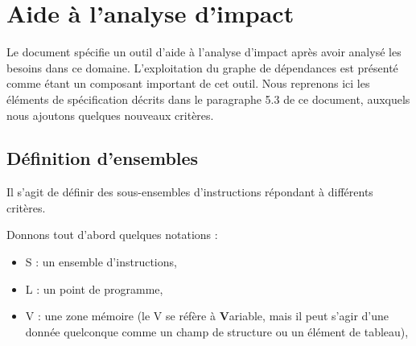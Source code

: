 \chapter{Aide à l'analyse d'impact}\label{sec-impact}

Le document \cite{baudinImpact} spécifie un outil d'aide à l'analyse d'impact
après avoir analysé les besoins dans ce domaine.
L'exploitation du graphe de dépendances est présenté comme étant 
un composant important de cet outil.
Nous reprenons ici les éléments de spécification 
décrits dans le paragraphe 5.3 de ce document,
auxquels nous ajoutons quelques nouveaux critères.\\


\section{Définition d'ensembles}\label{sec-ensembles}\label{sec-defR}

\newcommand{\remitem}[1]{\begin{itemize}\item #1 \end{itemize}}
\newcommand{\warnitem}[1]{\begin{itemize}\item[$\blacktriangle$] #1
                          \end{itemize}}
\newcommand{\question}[1]{\begin{itemize}\item[{\bf ?}] #1 \end{itemize}}
\newcommand{\smilitem}[1]{\begin{itemize}\item[$\smiley$] #1 \end{itemize}}
\newcommand{\frownitem}[1]{\begin{itemize}\item[$\frownie$] #1 \end{itemize}}


Il s'agit de définir des sous-ensembles d'instructions
répondant à différents critères.

Donnons tout d'abord quelques notations :
\begin{itemize}
\item S : un ensemble d'instructions,
\item L : un point de programme,
\item V : une zone mémoire (le V se réfère à {\bf V}ariable,
mais il peut s'agir d'une donnée quelconque comme un champ de structure ou
un élément de tableau),
\end{itemize}

